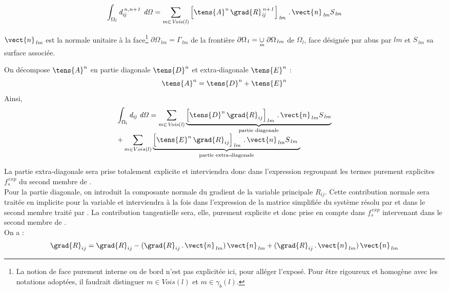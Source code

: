 \begin{equation}
\displaystyle\int_{\Omega_l} \it{d}^{\,n,n+1}_{ij}\ d\Omega =
\sum\limits_{m\in
Vois(l)} \left[
\tens{A}^n\,\grad{R}^{\,n+1}_{ij} \right]_{\,lm}\,.\,\vect{n}_{\,lm}S_{\,lm}
\end{equation}

$\vect{n}_{\,lm}$ est la normale unitaire \`a la face\footnote{La notion de
face purement interne ou de bord n'est pas explicit\'ee ici, pour all\'eger l'expos\'e. Pour \^etre rigoureux et homog\`ene avec les notations
adopt\'ees, il faudrait distinguer $ m\in {Vois(l)} $ et $ m\in {\gamma_b(l)}$.}
$ \partial \Omega_{\,lm} = \Gamma_{\,lm}$ de la fronti\`ere
 $\partial \Omega_{\,l} = \underset{\text{\it m}}{\cup}\ \partial
\Omega_{\,lm}$ de $\Omega_l$, face d\'esign\'ee par abus par $lm$ et $S_{\,lm}$ sa surface associ\'ee.

On d\'ecompose $\tens{A}^n$ en partie diagonale $\tens{D}^n$ et
extra-diagonale $\tens{E}^n$ :\\
$$\tens{A}^n =\tens{D}^n + \tens{E}^n$$
Ainsi,
\begin{equation}
\begin{array}{l}
\displaystyle \int_{\Omega_l} \it{d}_{ij}\ d\Omega =
\sum\limits_{m\in
Vois(l)} \underbrace{ \left[
\tens{D}^n\,\grad{R}_{ij}\right]_{\,lm}\,.\,\vect{n}_{\,lm}S_{\,lm} }
_{\text {partie diagonale}}\\
+ \displaystyle\sum\limits_{m\in
Vois(l)} \underbrace{ \left[
\tens{E}^n\,\grad{R}_{ij} \right]_{\,lm}\,.\,\vect{n}_{\,lm}S_{\,lm}\ }
_{\text {partie extra-diagonale}}
\end{array}
\end{equation}

La partie extra-diagonale sera prise totalement explicite et interviendra donc
dans l'expression regroupant les termes purement explicites $f_s^{\,exp}$ du
second membre de .\\
Pour la partie diagonale, on introduit la composante normale du gradient de la
variable principale $R_{ij}$. Cette  contribution normale sera trait\'ee en
implicite pour la variable et interviendra \`a la fois dans l'expression de la matrice simplifi\'ee du syst\`eme r\'esolu par  et dans
le second membre trait\'e par . La
contribution tangentielle sera, elle, purement explicite et donc prise en compte
dans $f_s^{\,exp}$ intervenant dans le second membre de .\\
On a :
\begin{equation}
\displaystyle
\grad{R}_{ij}  = \grad{R}_{ij} - (\grad{R}_{ij}\,.\,\vect{n}_{\,lm})\,\vect{n}_{\,lm} + (\grad{R}_{ij}\,.\,\vect{n}_{\,lm})\,\vect{n}_{\,lm}
\end{equation}

